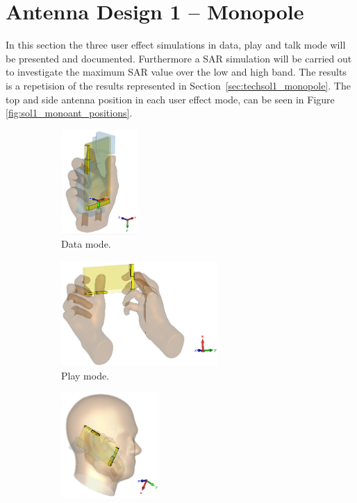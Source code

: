 
\section{Antenna Design 1 -- Monopole}
In this section the three user effect simulations in data, play and talk mode will be presented and documented. Furthermore a SAR simulation will be carried out to investigate the maximum SAR value over the low and high band. The results is a repetision of the results represented in Section~\ref{sec:techsol1_monopole}.    
The top and side antenna position in each user effect mode, can be seen in Figure \ref{fig:sol1_monoant_positions}.


\begin{figure}[htbp]
    \centering
    \begin{subfigure}[b]{0.24\linewidth}
        \centering \includegraphics[width=\linewidth,height=4cm,keepaspectratio]{img/tech_sol/monopole/data_mode/3d_data_mode.PNG}
        \caption{Data mode.}
    \end{subfigure}
    \begin{subfigure}[b]{0.24\linewidth}
        \centering \includegraphics[width=\linewidth,height=4cm,keepaspectratio]{img/tech_sol/monopole/play_mode/3d_play_mode.PNG}
        \caption{Play mode.}
    \end{subfigure}
    \begin{subfigure}[b]{0.24\linewidth}
        \centering \includegraphics[width=\linewidth,height=4cm,keepaspectratio]{img/tech_sol/monopole/talk_mode/3d_talk_mode.PNG}

\end{subfigure}
\end{figure}
